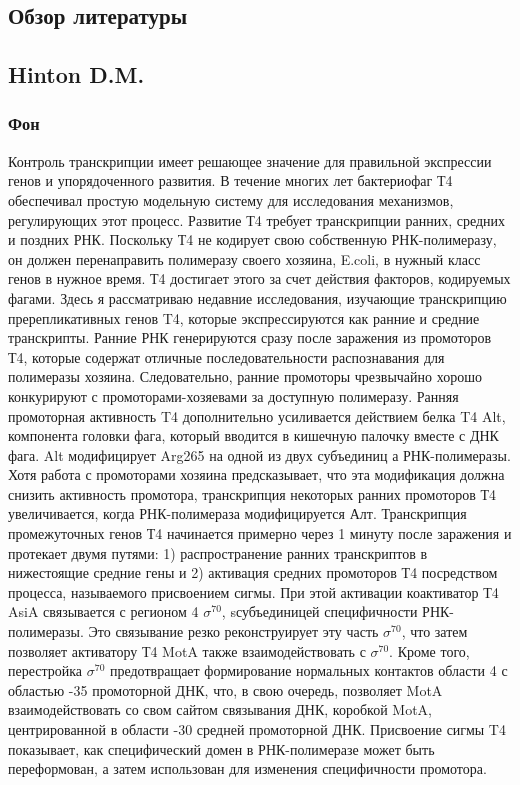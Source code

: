 \documentclass[a4paper,12pt]{article}
\begin{document}
\newpage
\begin{center}
\section{Обзор литературы} \label{sec:math}
\end{center}
\subsection{Hinton D.M.}
    \subsubsection{Фон}
        \par{Контроль транскрипции имеет решающее значение для правильной экспрессии генов и упорядоченного развития. В течение
        многих лет бактериофаг Т4 обеспечивал простую модельную систему для исследования механизмов, регулирующих этот
        процесс. Развитие Т4 требует транскрипции ранних, средних и поздних РНК. Поскольку Т4 не кодирует свою собственную
        РНК-полимеразу, он должен перенаправить полимеразу своего хозяина, E.coli, в нужный класс генов в нужное время. Т4
        достигает этого за счет действия факторов, кодируемых фагами. Здесь я рассматриваю недавние исследования, изучающие
        транскрипцию пререпликативных генов T4, которые экспрессируются как ранние и средние транскрипты. Ранние РНК
        генерируются сразу после заражения из промоторов Т4, которые содержат отличные последовательности распознавания для
        полимеразы хозяина. Следовательно, ранние промоторы чрезвычайно хорошо конкурируют с промоторами-хозяевами за
        доступную полимеразу. Ранняя промоторная активность T4 дополнительно усиливается действием белка T4 Alt, компонента
        головки фага, который вводится в кишечную палочку вместе с ДНК фага. Alt модифицирует Arg265 на одной из двух
        субъединиц а РНК-полимеразы. Хотя работа с промоторами хозяина предсказывает, что эта модификация должна снизить
        активность промотора, транскрипция некоторых ранних промоторов Т4 увеличивается, когда РНК-полимераза модифицируется
        Алт. Транскрипция промежуточных генов Т4 начинается примерно через 1 минуту после заражения и протекает двумя путями:
        1) распространение ранних транскриптов в нижестоящие средние гены и 2) активация средних промоторов Т4 посредством
        процесса, называемого присвоением сигмы. При этой активации коактиватор Т4 AsiA связывается с регионом 4
        \(\sigma^{70}\), sсубъединицей специфичности РНК-полимеразы. Это связывание резко реконструирует эту часть
        \(\sigma^{70}\), что затем позволяет активатору Т4 MotA также взаимодействовать с \(\sigma^{70}\). Кроме того,
        перестройка \(\sigma^{70}\) предотвращает формирование нормальных контактов области 4 с областью -35 промоторной ДНК,
        что, в свою очередь, позволяет MotA взаимодействовать со свом сайтом связывания ДНК, коробкой MotA, центрированной в
        области -30 средней промоторной ДНК. Присвоение сигмы T4 показывает, как специфический домен в РНК-полимеразе может
        быть переформован, а затем использован для изменения специфичности промотора. \cite{hinton}}
\end{document}
